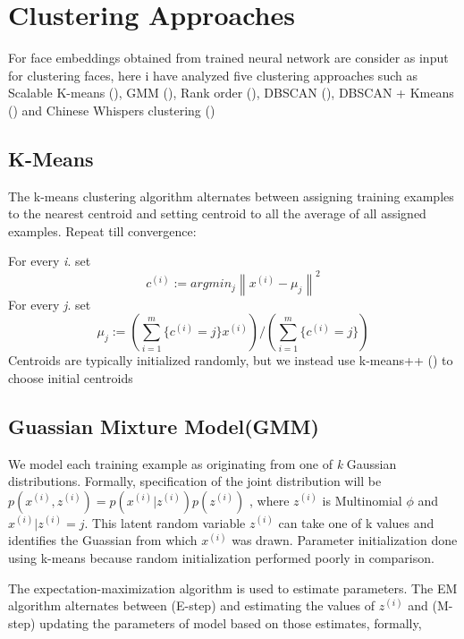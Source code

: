 \documentclass[a4paper,12pt, twoside]{NITKReport}
\begin{document}
\section{Clustering Approaches}
For face embeddings obtained from trained neural network are consider as input for clustering faces, here i have analyzed five clustering approaches such as Scalable K-means (\cite{bahmani2012scalable}), GMM (\cite{cui2007easyalbum}), Rank order (\cite{ho2003clustering}), DBSCAN (\cite{schroff2015facenet}), DBSCAN + Kmeans (\cite{tian2007face}) and Chinese Whispers clustering (\cite{biemann2006chinese})

\subsection{K-Means}
\par The k-means clustering algorithm alternates between assigning training examples to the nearest centroid and setting centroid to all the average of all assigned examples. Repeat till convergence:

For every \textit{i}. set
\begin{equation}
c^{(i)} := argmin_{j}\left \| x^{(i)} - \mu _{j} \right \|^{2}
\end{equation}
For every \textit{j}. set
\begin{equation}
\mu _{j} := (\sum_{i=1}^{m} \{ c^{(i)}=j \}x^{(i)})/(\sum_{i=1}^{m} \{ c^{(i)}=j \})
\end{equation}
Centroids are typically initialized randomly, but we instead use k-means++ (\cite{bahmani2012scalable}) to choose initial centroids

\subsection{Guassian Mixture Model(GMM)}
\par We model each training example as originating from one of \textit{k} Gaussian  distributions. Formally, specification of the joint distribution will be $p(x^{(i)},z^{(i)}) = p(x^{(i)}|z^{(i)})p(z^{(i)})$ , where $z^{(i)}$ is Multinomial $\phi$ and $x^{(i)}|z^{(i)} = j$. This latent random variable $z^{(i)}$ can take one of k values and identifies the Guassian from which $x^{(i)}$ was drawn. Parameter initialization done using k-means because random initialization performed poorly in comparison. 

The expectation-maximization algorithm is used to estimate parameters. The EM algorithm alternates between (E-step) and estimating the values of $z^{(i)}$ and (M-step) updating the parameters of model based on those estimates, formally,
\end{document}
